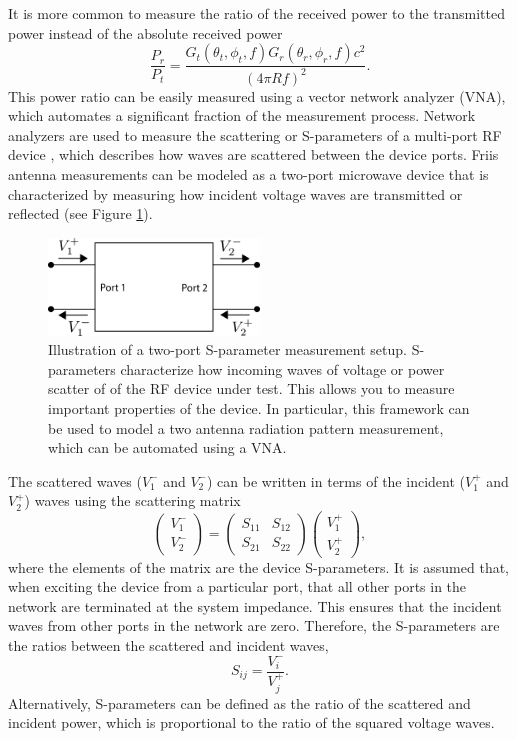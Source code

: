 It is more common to measure the ratio of the received power to the transmitted power instead of the absolute received power
\begin{equation}
    \frac{P_r}{P_t} = \frac{G_t(\theta_t,\phi_t,f)G_r(\theta_r,\phi_r,f)c^2}{(4\pi Rf)^2}.
\end{equation}
This power ratio can be easily measured using a vector network analyzer (VNA), which automates a significant fraction of the measurement process. Network analyzers are used to measure the scattering or S-parameters of a multi-port RF device \cite{pozar}, which describes how waves are scattered between the device ports. Friis antenna measurements can be modeled as a two-port microwave device that is characterized by measuring how incident voltage waves are transmitted or reflected (see Figure \ref{fig:2port-scattering}).
\begin{figure}[htbp]
    \centering
    \includegraphics[width=0.5\textwidth]{figs/Chapter-5/230429_2port_scattering_figure.png}
    \caption{Illustration of a two-port S-parameter measurement setup. S-parameters characterize how incoming waves of voltage or power scatter of of the RF device under test. This allows you to measure important properties of the device. In particular, this framework can be used to model a two antenna radiation pattern measurement, which can be automated using a VNA. }
    \label{fig:2port-scattering}
\end{figure}
The scattered waves ($V_1^-$ and $V_2^-$) can be written in terms of the incident ($V_1^+$ and $V_2^+$) waves using the scattering matrix
\begin{equation}
    \begin{pmatrix}
        V_1^-\\
        V_2^-
    \end{pmatrix} = 
    \begin{pmatrix}
        S_{11}&S_{12}\\
        S_{21}&S_{22}
    \end{pmatrix}
    \begin{pmatrix}
        V_1^+\\
        V_2^+
    \end{pmatrix},
\end{equation}
where the elements of the matrix are the device S-parameters. It is assumed that, when exciting the device from a particular port, that all other ports in the network are terminated at the system impedance. This ensures that the incident waves from other ports in the network are zero. Therefore, the S-parameters are the ratios between the scattered and incident waves,
\begin{equation}
    S_{ij} = \frac{V_i^-}{V_j^+}.
\end{equation}
Alternatively, S-parameters can be defined as the ratio of the scattered and incident power, which is proportional to the ratio of the squared voltage waves.

